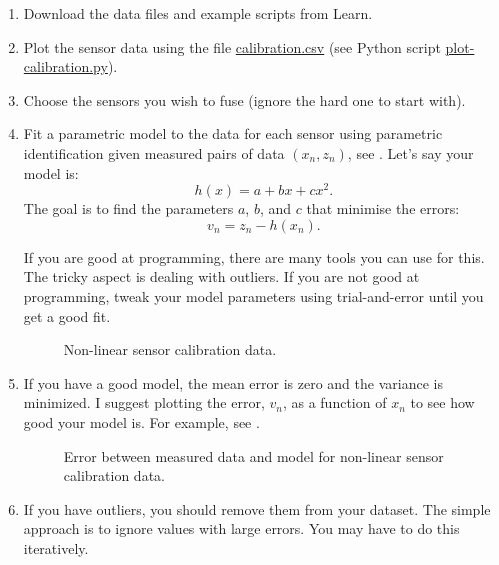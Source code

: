 \documentclass[a4paper, 12]{article}
\begin{document}
  
\begin{enumerate}
\item Download the data files and example scripts from Learn.
  
\item Plot the sensor data using the file \url{calibration.csv} (see
  Python script \url{plot-calibration.py}). 

\item Choose the sensors you wish to fuse (ignore the hard one to
  start with).

 
\item Fit a parametric model to the data for each sensor using
  parametric identification given measured pairs of data $(x_n, z_n)$,
  see .  Let's say your model is:
  \begin{equation}
    h(x) = a + b x + c x^2.
  \end{equation}
  The goal is to find the parameters $a$, $b$, and $c$ that minimise
  the errors:
    \begin{equation}
    v_n = z_n - h(x_n).
  \end{equation}

  If you are good at programming, there are many tools you can use for
  this.  The tricky aspect is dealing with outliers.  If you are not
  good at programming, tweak your model parameters using
  trial-and-error until you get a good fit.

  \begin{figure}[!h]
  \centering
  
  \caption{Non-linear sensor calibration data.}
  \label{fig:fit}    
  \end{figure}

  
  \item If you have a good model, the mean error is zero and the
    variance is minimized.  I suggest plotting the error, $v_n$, as a
    function of $x_n$ to see how good your model is.  For example, see
    .

    \begin{figure}[!h]
  \centering
  
  \caption{Error between measured data and model for non-linear sensor
    calibration data.}
  \label{fig:errors}  
  \end{figure}


    
\item If you have outliers, you should remove them from your dataset.
  The simple approach is to ignore values with large errors.  You may
  have to do this iteratively.


\end{enumerate}
\end{document}
